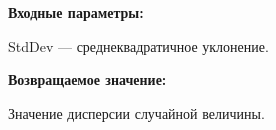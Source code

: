 \textbf{Входные параметры:}

 StdDev --- среднеквадратичное уклонение.

\textbf{Возвращаемое значение:}

 Значение дисперсии случайной величины.
